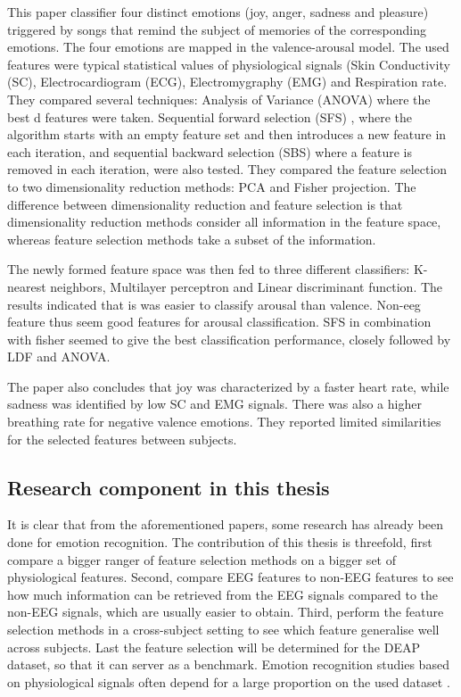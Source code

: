 \npar

This paper classifier four distinct emotions (joy, anger, sadness and pleasure) triggered by songs that remind the subject of memories of the corresponding emotions. The four emotions are mapped in the valence-arousal model. The used features were typical statistical values of physiological signals (Skin Conductivity (SC), Electrocardiogram (ECG), Electromygraphy (EMG) and Respiration rate. They compared several techniques: Analysis of Variance (ANOVA)  where the best d features were taken. Sequential forward selection (SFS) , where the algorithm starts with an empty feature set and then introduces a new feature in each iteration, and sequential backward selection (SBS)  where a feature is removed in each iteration, were also tested. They compared the feature selection to two dimensionality reduction methods: PCA and Fisher projection. The difference between dimensionality reduction and feature selection is that dimensionality reduction methods consider all information in the feature space, whereas feature selection methods take a subset of the information.

\npar

The newly formed feature space was then fed to three different classifiers: K-nearest neighbors, Multilayer perceptron and Linear discriminant function. The results indicated that is was easier to classify arousal than valence. Non-eeg feature thus seem good features for arousal classification. SFS in combination with fisher seemed to give the best classification performance, closely followed by LDF and ANOVA.

\npar

The paper also concludes that joy was characterized by a faster heart rate, while sadness was identified by low SC and EMG signals. There was also a higher breathing rate for negative valence emotions. They reported limited similarities for the selected features between subjects.

\subsection{Research component in this thesis}

It is clear that from the aforementioned papers, some research has already been done for emotion recognition. The contribution of this thesis is threefold, first compare a bigger ranger of feature selection methods on a bigger set of physiological features. Second, compare EEG features to non-EEG features to see how much information can be retrieved from the EEG signals compared to the non-EEG signals, which are usually easier to obtain. Third, perform the feature selection methods in a cross-subject setting to see which feature generalise well across subjects. Last the feature selection will be determined for the DEAP dataset, so that it can server as a benchmark. Emotion recognition studies based on physiological signals often depend for a large proportion on the used dataset \citep{PhytoEm}.

